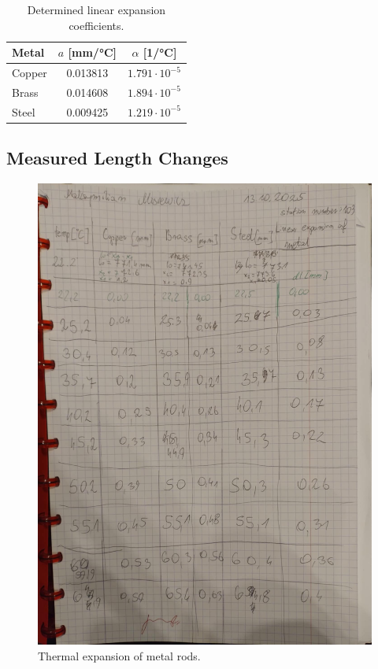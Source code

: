 \begin{table}[H]
\centering
\begin{tabular}{l c c}
\toprule
Metal & $a$ [mm/°C] & $\alpha$ [1/°C] \\
\midrule
Copper & 0.013813 & $1.791 \cdot 10^{-5}$ \\
Brass  & 0.014608 & $1.894 \cdot 10^{-5}$ \\
Steel  & 0.009425 & $1.219 \cdot 10^{-5}$ \\
\bottomrule
\end{tabular}
\caption{Determined linear expansion coefficients.}
\end{table}

\subsection*{Measured Length Changes}

\begin{figure}[H]
    \centering
    \includegraphics[width=1\textwidth]{figures/measurements.png}
    \caption{Thermal expansion of metal rods.}
    \label{fig:expansion_plot}
\end{figure}

